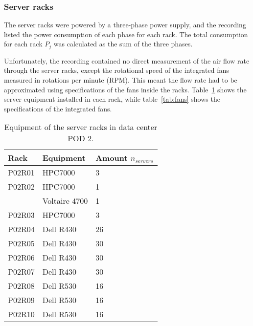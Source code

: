 \subsubsection{Server racks}
The server racks were powered by a three-phase power supply, and the recording listed the power consumption of each phase for each rack. The total consumption for each rack $P_j$ was calculated as the sum of the three phases.

Unfortunately, the recording contained no direct measurement of the air flow rate through the server racks, except the rotational speed of the integrated fans measured in rotations per minute (RPM). This meant the flow rate had to be approximated using specifications of the fans inside the racks. Table~\ref{tab:equipment} shows the server equipment installed in each rack, while table~\ref{tab:fans} shows the specifications of the integrated fans.

\begin{table}[h]
\caption{Equipment of the server racks in data center POD 2.}
\begin{center}
    \begin{tabular}{ | l | l | p{1.7cm} |}
    \hline
    \bfseries Rack & \bfseries Equipment & \bfseries Amount $n_{servers}$ \\ \hline
    P02R01 & HPC7000 & 3 \\ \hline
	P02R02 & HPC7000 & 1 \\
	 & Voltaire 4700 & 1 \\ \hline
	P02R03 & HPC7000 & 3 \\ \hline
	P02R04 & Dell R430 & 26 \\ \hline
	P02R05 & Dell R430 & 30 \\ \hline
	P02R06 & Dell R430 & 30 \\ \hline
	P02R07 & Dell R430 & 30 \\ \hline
	P02R08 & Dell R530 & 16 \\ \hline
	P02R09 & Dell R530 & 16 \\ \hline
	P02R10 & Dell R530 & 16 \\ \hline
    \end{tabular}
\end{center}
\label{tab:equipment}
\end{table}

